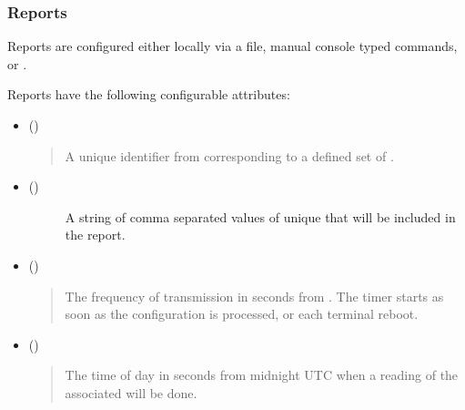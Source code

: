 \documentclass[letterpaper,10pt,english]{sphinxmanual}
\begin{document}
\subsubsection{Reports}
\label{\detokenize{configuration:reports}}
Reports are configured either locally via a  file, manual console typed commands,  or .

Reports have the following configurable attributes:
\begin{itemize}
\item {} 
 ()
\begin{quote}

A unique identifier from  corresponding to a defined set of .
\end{quote}

\item {} \begin{description}
\item[{ ()}] \leavevmode
A string of comma separated values of unique  that will be included in the report.

\end{description}

\item {} 
 ()
\begin{quote}

The frequency of transmission in seconds from .  The timer starts as soon as the configuration is processed, or each terminal reboot.

\end{quote}

\item {} 
 ()
\begin{quote}

The time of day in seconds from midnight UTC  when a  reading of the associated  will be done.


\end{quote}
\end{itemize}
\end{document}
